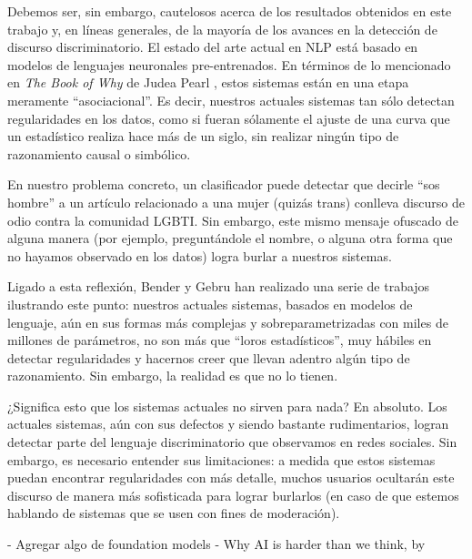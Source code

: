 
Debemos ser, sin embargo, cautelosos acerca de los resultados obtenidos en este trabajo y, en líneas generales, de la mayoría de los avances en la detección de discurso discriminatorio. El estado del arte actual en NLP está basado en modelos de lenguajes neuronales pre-entrenados. En términos de lo mencionado en \emph{The Book of Why} de Judea Pearl \cite{pearl2018book}, estos sistemas están en una etapa meramente ``asociacional''. Es decir, nuestros actuales sistemas tan sólo detectan regularidades en los datos, como si fueran sólamente el ajuste de una curva que un estadístico realiza hace más de un siglo, sin realizar ningún tipo de razonamiento causal o simbólico.

En nuestro problema concreto, un clasificador puede detectar que decirle ``sos hombre'' a un artículo relacionado a una mujer (quizás trans) conlleva discurso de odio contra la comunidad LGBTI. Sin embargo, este mismo mensaje ofuscado de alguna manera (por ejemplo, preguntándole el nombre, o alguna otra forma que no hayamos observado en los datos) logra burlar a nuestros sistemas.

Ligado a esta reflexión, Bender y Gebru  han realizado una serie de trabajos ilustrando este punto: nuestros actuales sistemas, basados en modelos de lenguaje, aún en sus formas más complejas y sobreparametrizadas con miles de millones de parámetros, no son más que ``loros estadísticos'', muy hábiles en detectar regularidades y hacernos creer que llevan adentro algún tipo de razonamiento. Sin embargo, la realidad es que no lo tienen.

¿Significa esto que los sistemas actuales no sirven para nada? En absoluto. Los actuales sistemas, aún con sus defectos y siendo bastante rudimentarios, logran detectar parte del lenguaje discriminatorio que observamos en redes sociales. Sin embargo, es necesario entender sus limitaciones: a medida que estos sistemas puedan encontrar regularidades con más detalle, muchos usuarios ocultarán este discurso de manera más sofisticada para lograr burlarlos (en caso de que estemos hablando de sistemas que se usen con fines de moderación).

- Agregar algo de foundation models
- Why AI is harder than we think, by